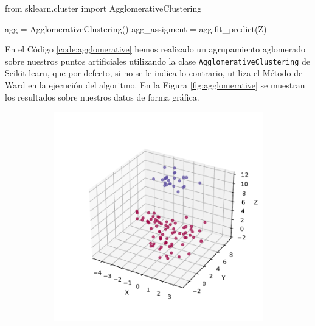 \begin{mypython}[float={h}, caption={Agrupamiento aglomerativo.}, label={code:agglomerative}]
  from sklearn.cluster import AgglomerativeClustering

  agg = AgglomerativeClustering()
  agg_assigment = agg.fit_predict(Z)
\end{mypython}

En el Código \ref{code:agglomerative} hemos realizado un agrupamiento aglomerado sobre nuestros puntos artificiales utilizando la clase \texttt{AgglomerativeClustering} de Scikit-learn, que por defecto, si no se le indica lo contrario, utiliza el Método de Ward en la ejecución del algoritmo. En la Figura \ref{fig:agglomerative} se muestran los resultados sobre nuestros datos de forma gráfica.

\begin{figure}[h]
  \centering
  \begin{subfigure}{0.45\textwidth}
    \centering
    \includegraphics[width=\textwidth]{figures/agglomerative-3d.pdf}
    \caption{}
    \label{fig:agg-3d}
  \end{subfigure}
  \begin{subfigure}{0.45\textwidth}
    \centering

\end{subfigure}
\end{figure}
